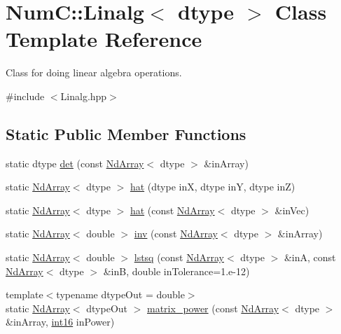 \UseRawInputEncoding
\hypertarget{class_num_c_1_1_linalg}{}\section{NumC\+:\+:Linalg$<$ dtype $>$ Class Template Reference}
\label{class_num_c_1_1_linalg}


Class for doing linear algebra operations.  




{\ttfamily \#include $<$Linalg.\+hpp$>$}

\subsection*{Static Public Member Functions}
\begin{DoxyCompactItemize}
\item 
static dtype \mbox{\hyperlink{class_num_c_1_1_linalg_a72b53511efc570e3b030cbc6e549be91}{det}} (const \mbox{\hyperlink{class_num_c_1_1_nd_array}{Nd\+Array}}$<$ dtype $>$ \&in\+Array)
\item 
static \mbox{\hyperlink{class_num_c_1_1_nd_array}{Nd\+Array}}$<$ dtype $>$ \mbox{\hyperlink{class_num_c_1_1_linalg_a8819524018933c08f89f86ddda3f6779}{hat}} (dtype inX, dtype inY, dtype inZ)
\item 
static \mbox{\hyperlink{class_num_c_1_1_nd_array}{Nd\+Array}}$<$ dtype $>$ \mbox{\hyperlink{class_num_c_1_1_linalg_adb223dd51b52f44b942bcddd1717bba8}{hat}} (const \mbox{\hyperlink{class_num_c_1_1_nd_array}{Nd\+Array}}$<$ dtype $>$ \&in\+Vec)
\item 
static \mbox{\hyperlink{class_num_c_1_1_nd_array}{Nd\+Array}}$<$ double $>$ \mbox{\hyperlink{class_num_c_1_1_linalg_a8391fecf007442cc681631ad02d4c637}{inv}} (const \mbox{\hyperlink{class_num_c_1_1_nd_array}{Nd\+Array}}$<$ dtype $>$ \&in\+Array)
\item 
static \mbox{\hyperlink{class_num_c_1_1_nd_array}{Nd\+Array}}$<$ double $>$ \mbox{\hyperlink{class_num_c_1_1_linalg_a1fce87cb93eb80648efcbcb01ddb3ae7}{lstsq}} (const \mbox{\hyperlink{class_num_c_1_1_nd_array}{Nd\+Array}}$<$ dtype $>$ \&inA, const \mbox{\hyperlink{class_num_c_1_1_nd_array}{Nd\+Array}}$<$ dtype $>$ \&inB, double in\+Tolerance=1.e-\/12)
\item 
{\footnotesize template$<$typename dtype\+Out  = double$>$ }\\static \mbox{\hyperlink{class_num_c_1_1_nd_array}{Nd\+Array}}$<$ dtype\+Out $>$ \mbox{\hyperlink{class_num_c_1_1_linalg_afaf9148bc1f59c36a744e46472864a53}{matrix\+\_\+power}} (const \mbox{\hyperlink{class_num_c_1_1_nd_array}{Nd\+Array}}$<$ dtype $>$ \&in\+Array, \mbox{\hyperlink{namespace_num_c_a55b6140ac3972d03a7277fc227478dc2}{int16}} in\+Power)

\end{DoxyCompactItemize}
